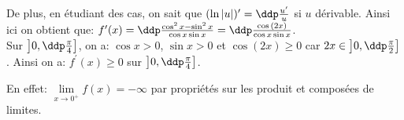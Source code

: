 \begin{correction}
\begin{enumerate}
\noindent De plus, en \'etudiant des cas, on sait que $(\ln{|u|})^{\prime}=\ddp\frac{u^{\prime}}{u}$ si $u$ d\'erivable. Ainsi ici on obtient que: $f^{\prime}(x)=\ddp\frac{  \cos^2{x} - \sin^2{x}  }{\cos{x} \sin{x}}=\ddp\frac{\cos{(2x)}}{\cos{x} \sin{x}} $.\\
\noindent Sur $\left\rbrack 0,\ddp\frac{\pi}{4}\right\rbrack$, on a: $\cos{x}> 0$, $\sin{x}>0$ et $\cos{(2x)}\geq 0$ car $2x\in \left\rbrack 0,\ddp\frac{\pi}{2}\right\rbrack$. Ainsi on a: $f^{\prime}(x)\geq 0$ sur $\left\rbrack 0,\ddp\frac{\pi}{4}\right\rbrack$.
\begin{center}
\end{center}
En effet: $\lim\limits_{x\to 0^+} f(x)=-\infty$ par propri\'et\'es sur les produit et compos\'ees de limites. 
\end{enumerate}
\end{correction}

